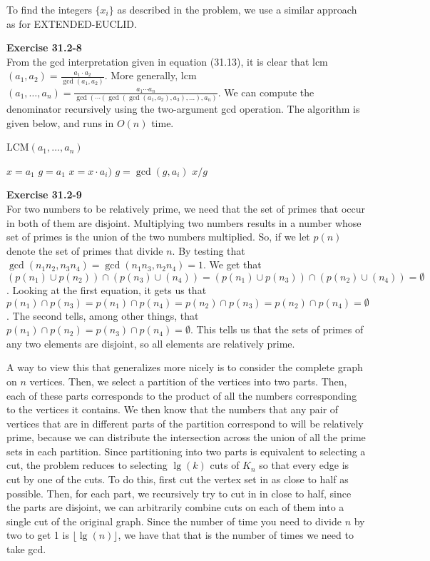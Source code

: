 \documentclass{article}
\begin{document}
To find the integers $\{x_i\}$ as described in the problem, we use a similar approach as for EXTENDED-EUCLID. 

\noindent\textbf{Exercise 31.2-8}\\

From the gcd interpretation given in equation (31.13), it is clear that lcm$(a_1, a_2) = \frac{a_1 \cdot a_2}{\gcd(a_1,a_2)}$.  More generally, lcm$(a_1,\ldots,a_n) = \frac{a_1\cdots a_n}{\gcd( \cdots (\gcd(\gcd(a_1,a_2), a_3), \ldots),a_n)}$. We can compute the denominator recursively using the two-argument gcd operation.  The algorithm is given below, and runs in $O(n)$ time. \\

\begin{algorithm}
\caption{LCM$(a_1,\ldots, a_n)$}
\begin{algorithmic}
\State $x = a_1$
\State $g = a_1$
	\State $x = x \cdot a_i)$
	\State $g = \gcd(g,a_i)$
\EndFor
\State \Return $x/g$
\end{algorithmic}
\end{algorithm}

\noindent\textbf{Exercise 31.2-9}\\

For two numbers to be relatively prime, we need that the set of primes that occur in both of them are disjoint. Multiplying two numbers results in a number whose set of primes is the union of the two numbers multiplied. So, if we let $p(n)$ denote the set of primes that divide $n$. By testing that $ \gcd(n_1n_2,n_3n_4) = \gcd(n_1n_3, n_2n_4) = 1$. We get that $(p(n_1)\cup p(n_2))\cap(p(n_3)\cup(n_4)) = (p(n_1)\cup p(n_3))\cap(p(n_2)\cup(n_4)) = \emptyset$. Looking at the first equation, it gets us that $p(n_1) \cap p(n_3) = p(n_1) \cap p(n_4)  = p(n_2) \cap p(n_3) = p(n_2) \cap p(n_4) = \emptyset$. The second tells, among other things, that $p(n_1) \cap p(n_2) = p(n_3) \cap p(n_4) = \emptyset$. This tells us that the sets of primes of any two elements are disjoint, so all elements are relatively prime.

 A way to view this that generalizes more nicely is to consider the complete graph on $n$ vertices. Then, we select a partition of the vertices into two parts. Then, each of these parts corresponds to the product of all the numbers corresponding to the vertices it contains. We then know that the numbers that any pair of vertices that are in different parts of the partition correspond to will be relatively prime, because we can distribute the intersection across the union of all the prime sets in each partition. Since partitioning into two parts is equivalent to selecting a cut, the problem reduces to selecting $\lg(k)$ cuts of $K_n$ so that every edge is cut by one of the cuts. To do this, first cut the vertex set in as close to half as possible. Then, for each part, we recursively try to cut in in close to half, since the parts are disjoint, we can arbitrarily combine cuts on each of them into a single cut of the original graph. Since the number of time you need to divide $n$ by two to get 1 is $\lfloor\lg(n)\rfloor$, we have that that is the number of times we need to take gcd.\\
\end{document}
